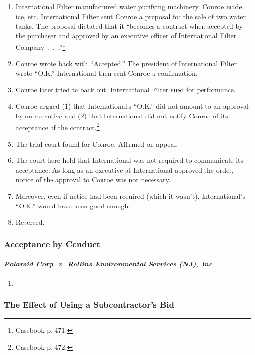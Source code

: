\begin{enumerate}
    \item International Filter manufactured water purifying machinery. Conroe 
    made ice, etc. International Filter sent Conroe a proposal for the sale of 
    two water tanks. The proposal dictated that it ``becomes a contract when 
    accepted by the purchaser and approved by an executive officer of 
    International Filter Company~.~.~.''\footnote{Casebook p. 471.}
    \item Conroe wrote back with ``Accepted.'' The president of International 
    Filter wrote ``O.K.'' International then sent Conroe a confirmation.
    \item Conroe later tried to back out. International Filter sued for 
    performance.
    \item Conroe argued (1) that International's ``O.K.'' did not amount to an 
    approval by an executive and (2) that International did not notify Conroe 
    of its acceptance of the contract.\footnote{Casebook p. 472.}
    \item The trial court found for Conroe. Affirmed on appeal.
    \item The court here held that International was not required to 
    communicate its acceptance. As long as an executive at International 
    approved the order, notice of the approval to Conroe was not necessary.
    \item Moreover, even if notice had been required (which it wasn't), 
    International's ``O.K.'' would have been good enough.
    \item Reversed.
\end{enumerate}

\subsubsection{Acceptance by Conduct}

\paragraph{\emph{Polaroid Corp. v. Rollins Environmental Services (NJ), Inc.}}

\begin{enumerate}
    \item %
\end{enumerate}

\subsubsection{The Effect of Using a Subcontractor's Bid}


